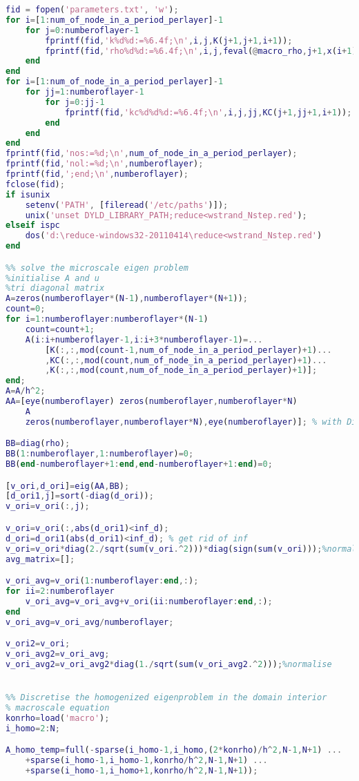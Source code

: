 \begin{lstlisting}[language=Matlab,caption=The Levenberg--Marquardt algorithm iteratively finds optimal macroscale Robin boundary conditions., label=matn1]
%% write rho and k into txt file for reduce
fid = fopen('parameters.txt', 'w');
for i=[1:num_of_node_in_a_period_perlayer]-1
    for j=0:numberoflayer-1
        fprintf(fid,'k%d%d:=%6.4f;\n',i,j,K(j+1,j+1,i+1));
        fprintf(fid,'rho%d%d:=%6.4f;\n',i,j,feval(@macro_rho,j+1,x(i+1)));
    end
end
for i=[1:num_of_node_in_a_period_perlayer]-1
    for jj=1:numberoflayer-1
        for j=0:jj-1
            fprintf(fid,'kc%d%d%d:=%6.4f;\n',i,j,jj,KC(j+1,jj+1,i+1));
        end
    end
end
fprintf(fid,'nos:=%d;\n',num_of_node_in_a_period_perlayer);
fprintf(fid,'nol:=%d;\n',numberoflayer);
fprintf(fid,';end;\n',numberoflayer);
fclose(fid);
if isunix
    setenv('PATH', [fileread('/etc/paths')]);
    unix('unset DYLD_LIBRARY_PATH;reduce<wstrand_Nstep.red');
elseif ispc
    dos('d:\reduce-windows32-20110414\reduce<wstrand_Nstep.red')
end

%% solve the microscale eigen problem
%initialise A and u
%tri diagonal matrix
A=zeros(numberoflayer*(N-1),numberoflayer*(N+1));
count=0;
for i=1:numberoflayer:numberoflayer*(N-1)
    count=count+1;
    A(i:i+numberoflayer-1,i:i+3*numberoflayer-1)=...
        [K(:,:,mod(count-1,num_of_node_in_a_period_perlayer)+1)...
        ,KC(:,:,mod(count,num_of_node_in_a_period_perlayer)+1)...
        ,K(:,:,mod(count,num_of_node_in_a_period_perlayer)+1)];
end;
A=A/h^2;
AA=[eye(numberoflayer) zeros(numberoflayer,numberoflayer*N)
    A
    zeros(numberoflayer,numberoflayer*N),eye(numberoflayer)]; % with Dirichlet boundary condition

BB=diag(rho);
BB(1:numberoflayer,1:numberoflayer)=0;
BB(end-numberoflayer+1:end,end-numberoflayer+1:end)=0;

[v_ori,d_ori]=eig(AA,BB);
[d_ori1,j]=sort(-diag(d_ori));
v_ori=v_ori(:,j);

v_ori=v_ori(:,abs(d_ori1)<inf_d);
d_ori=d_ori1(abs(d_ori1)<inf_d); % get rid of inf
v_ori=v_ori*diag(2./sqrt(sum(v_ori.^2)))*diag(sign(sum(v_ori)));%normalise
avg_matrix=[];

v_ori_avg=v_ori(1:numberoflayer:end,:);
for ii=2:numberoflayer
    v_ori_avg=v_ori_avg+v_ori(ii:numberoflayer:end,:);
end
v_ori_avg=v_ori_avg/numberoflayer;

v_ori2=v_ori;
v_ori_avg2=v_ori_avg;
v_ori_avg2=v_ori_avg2*diag(1./sqrt(sum(v_ori_avg2.^2)));%normalise


%% Discretise the homogenized eigenproblem in the domain interior
% macroscale equation
konrho=load('macro');
i_homo=2:N;

A_homo_temp=full(-sparse(i_homo-1,i_homo,(2*konrho)/h^2,N-1,N+1) ...
    +sparse(i_homo-1,i_homo-1,konrho/h^2,N-1,N+1) ...
    +sparse(i_homo-1,i_homo+1,konrho/h^2,N-1,N+1));


\end{lstlisting}
